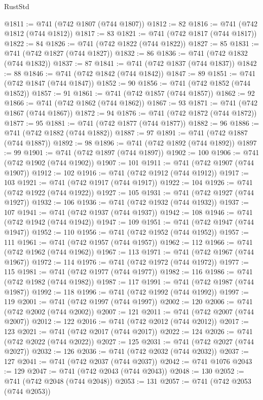 \begin{lexlean}{RustStd}
\begin{coremodule}
{\begin{coremodule}
{{{{{{{{{{{{{{{{{{{{{{{{{{{{{{{{{{{{{{{{{{{{{@1811 := @741 (@742 @1807 (@744 @1807))
@1812 := 82
@1816 := @741 (@742 @1812 (@744 @1812))
@1817 := 83
@1821 := @741 (@742 @1817 (@744 @1817))
@1822 := 84
@1826 := @741 (@742 @1822 (@744 @1822))
@1827 := 85
@1831 := @741 (@742 @1827 (@744 @1827))
@1832 := 86
@1836 := @741 (@742 @1832 (@744 @1832))
@1837 := 87
@1841 := @741 (@742 @1837 (@744 @1837))
@1842 := 88
@1846 := @741 (@742 @1842 (@744 @1842))
@1847 := 89
@1851 := @741 (@742 @1847 (@744 @1847))
@1852 := 90
@1856 := @741 (@742 @1852 (@744 @1852))
@1857 := 91
@1861 := @741 (@742 @1857 (@744 @1857))
@1862 := 92
@1866 := @741 (@742 @1862 (@744 @1862))
@1867 := 93
@1871 := @741 (@742 @1867 (@744 @1867))
@1872 := 94
@1876 := @741 (@742 @1872 (@744 @1872))
@1877 := 95
@1881 := @741 (@742 @1877 (@744 @1877))
@1882 := 96
@1886 := @741 (@742 @1882 (@744 @1882))
@1887 := 97
@1891 := @741 (@742 @1887 (@744 @1887))
@1892 := 98
@1896 := @741 (@742 @1892 (@744 @1892))
@1897 := 99
@1901 := @741 (@742 @1897 (@744 @1897))
@1902 := 100
@1906 := @741 (@742 @1902 (@744 @1902))
@1907 := 101
@1911 := @741 (@742 @1907 (@744 @1907))
@1912 := 102
@1916 := @741 (@742 @1912 (@744 @1912))
@1917 := 103
@1921 := @741 (@742 @1917 (@744 @1917))
@1922 := 104
@1926 := @741 (@742 @1922 (@744 @1922))
@1927 := 105
@1931 := @741 (@742 @1927 (@744 @1927))
@1932 := 106
@1936 := @741 (@742 @1932 (@744 @1932))
@1937 := 107
@1941 := @741 (@742 @1937 (@744 @1937))
@1942 := 108
@1946 := @741 (@742 @1942 (@744 @1942))
@1947 := 109
@1951 := @741 (@742 @1947 (@744 @1947))
@1952 := 110
@1956 := @741 (@742 @1952 (@744 @1952))
@1957 := 111
@1961 := @741 (@742 @1957 (@744 @1957))
@1962 := 112
@1966 := @741 (@742 @1962 (@744 @1962))
@1967 := 113
@1971 := @741 (@742 @1967 (@744 @1967))
@1972 := 114
@1976 := @741 (@742 @1972 (@744 @1972))
@1977 := 115
@1981 := @741 (@742 @1977 (@744 @1977))
@1982 := 116
@1986 := @741 (@742 @1982 (@744 @1982))
@1987 := 117
@1991 := @741 (@742 @1987 (@744 @1987))
@1992 := 118
@1996 := @741 (@742 @1992 (@744 @1992))
@1997 := 119
@2001 := @741 (@742 @1997 (@744 @1997))
@2002 := 120
@2006 := @741 (@742 @2002 (@744 @2002))
@2007 := 121
@2011 := @741 (@742 @2007 (@744 @2007))
@2012 := 122
@2016 := @741 (@742 @2012 (@744 @2012))
@2017 := 123
@2021 := @741 (@742 @2017 (@744 @2017))
@2022 := 124
@2026 := @741 (@742 @2022 (@744 @2022))
@2027 := 125
@2031 := @741 (@742 @2027 (@744 @2027))
@2032 := 126
@2036 := @741 (@742 @2032 (@744 @2032))
@2037 := 127
@2041 := @741 (@742 @2037 (@744 @2037))
@2042 := @741 @1076
@2043 := 129
@2047 := @741 (@742 @2043 (@744 @2043))
@2048 := 130
@2052 := @741 (@742 @2048 (@744 @2048))
@2053 := 131
@2057 := @741 (@742 @2053 (@744 @2053))
}}}}}}}}}}}}}}}}}}}}}}}}}}}}}}}}}}}}}}}}}}}}}
\end{coremodule}}
\end{coremodule}
\end{lexlean}
